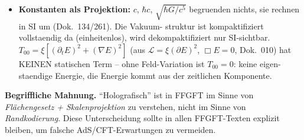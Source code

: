 \begin{itemize}
        (in nat.~Einheiten sind beide über $\hbar c$ dual). Wohl aber existiert
        die Kette $\xi\to E_H=E_0\xi^{41/4}\to R_H=\hbar c/E_H\to H_0=E_H/\hbar$
        ($\approx 66{,}2$ km/s/Mpc; Dok.~026/182), mit $\hbar c$ als SI-Faktor.
        $H_0$ ist damit ein geometrischer, als Expansion fehlgedeuteter
        Koeffizient; modellneutral bleibt die Observable $z(d)$.
        Offen: Exponent $41/4$ noch nicht voll hergeleitet.
  \item \textbf{Konstanten als Projektion:} $c$, $\hbar c$, $\sqrt{\hbar G/c^5}$
        begruenden nichts, sie rechnen in SI um (Dok.~134/261). Die Vakuum-
        struktur ist kompaktifiziert vollstaendig da (einheitenlos), wird
        dekompaktifiziert nur SI-sichtbar. $T_{00}=\xi[(\partial_t E)^2+(\nabla E)^2]$
        (aus $\mathcal{L}=\xi(\partial E)^2$, $\Box E=0$, Dok.~010) hat KEINEN
        statischen Term -- ohne Feld-Variation ist $T_{00}=0$: keine eigen-
        staendige Energie, die Energie kommt aus der zeitlichen Komponente.
\end{itemize}

\noindent
\textbf{Begriffliche Mahnung.} \enquote{Holografisch} ist in FFGFT im Sinne
von \emph{Flächengesetz + Skalenprojektion} zu verstehen, nicht im Sinne von
\emph{Randkodierung}. Diese Unterscheidung sollte in allen FFGFT-Texten
explizit bleiben, um falsche AdS/CFT-Erwartungen zu vermeiden.
